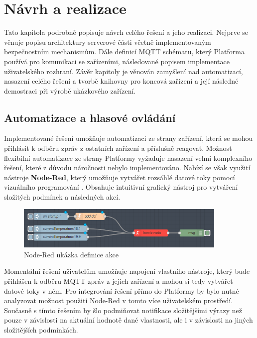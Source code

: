 \chapter{Návrh a realizace}
Tato kapitola podrobně popisuje návrh celého řešení a jeho realizaci. Nejprve se věnuje popisu architektury serverové části včetně implementovaným bezpečnostním mechanismům. Dále definicí MQTT schématu, který Platforma používá pro komunikaci se zařízeními, následované popisem implementace uživatelského rozhraní. Závěr kapitoly je věnován zamyšlení nad automatizací, nasazení celého řešení a tvorbě knihovny pro koncová zařízení a její následné demostraci při výrobě ukázkového zařízení.





\section{Automatizace a hlasové ovládání}
Implementované řešení umožňuje automatizaci ze strany zařízení, která se mohou přihlásit k odběru zpráv z ostatních zařízení a příslušně reagovat. Možnost flexibilní automatizace ze strany Platformy vyžaduje nasazení velmi komplexního řešení, které z důvodu náročnosti nebylo implementováno. Nabízí se však využití nástroje \textbf{Node-Red}, který umožňuje vytvářet rozsáhlé datové toky pomocí vizuálního programování \cite{node-red}. Obsahuje intuitivní grafický nástroj pro vytváření složitých podmínek a následných akcí.

\begin{figure}[htbp]
    \centering
    \includegraphics[width=0.9\textwidth]{img/homie-node-node.png}
    \caption{Node-Red ukázka definice akce \cite{node-red-homie}}
\end{figure}

Momentální řešení uživatelům umožňuje napojení vlastního nástroje, který bude přihlášen k odběru MQTT zpráv z jejich zařízení a mohou si tedy vytvářet datové toky v něm. Pro integrování řešení přímo do Platformy by bylo nutné analyzovat možnost použití Node-Red v tomto více uživatelském prostředí. Současně s tímto řešením by šlo podmiňovat notifikace složitějšími výrazy než pouze v závislosti na aktuální hodnotě dané vlastnosti, ale i v závislosti na jiných složitějších podmínkách.

